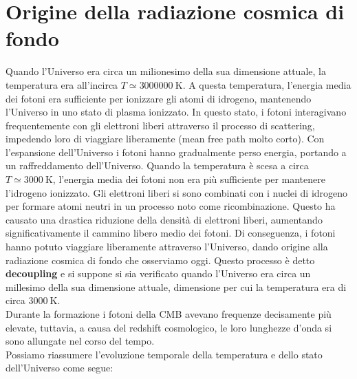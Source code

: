 \section{Origine della radiazione cosmica di fondo}
Quando l'Universo era circa un milionesimo della sua dimensione attuale, la temperatura era all'incirca $T \simeq \qty{3000000}{\kelvin}$. A questa temperatura, l'energia media dei fotoni era sufficiente per ionizzare gli atomi di idrogeno, mantenendo l'Universo in uno stato di plasma ionizzato. In questo stato, i fotoni interagivano frequentemente con gli elettroni liberi attraverso il processo di scattering, impedendo loro di viaggiare liberamente (mean free path molto corto). Con l'espansione dell'Universo i fotoni hanno gradualmente perso energia, portando a un raffreddamento dell'Universo. Quando la temperatura è scesa a circa $T \simeq \qty{3000}{\kelvin}$, l'energia media dei fotoni non era più sufficiente per mantenere l'idrogeno ionizzato. Gli elettroni liberi si sono combinati con i nuclei di idrogeno per formare atomi neutri in un processo noto come ricombinazione. Questo ha causato una drastica riduzione della densità di elettroni liberi, aumentando significativamente il cammino libero medio dei fotoni. Di conseguenza, i fotoni hanno potuto viaggiare liberamente attraverso l'Universo, dando origine alla radiazione cosmica di fondo che osserviamo oggi. Questo processo è detto \textbf{decoupling} e si suppone si sia verificato quando l'Universo era circa un millesimo della sua dimensione attuale, dimensione per cui la temperatura era di circa $\qty{3000}{\kelvin}$.\\
Durante la formazione i fotoni della CMB avevano frequenze decisamente più elevate, tuttavia, a causa del redshift cosmologico, le loro lunghezze d'onda si sono allungate nel corso del tempo.\\
Possiamo riassumere l'evoluzione temporale della temperatura e dello stato dell'Universo come segue:

